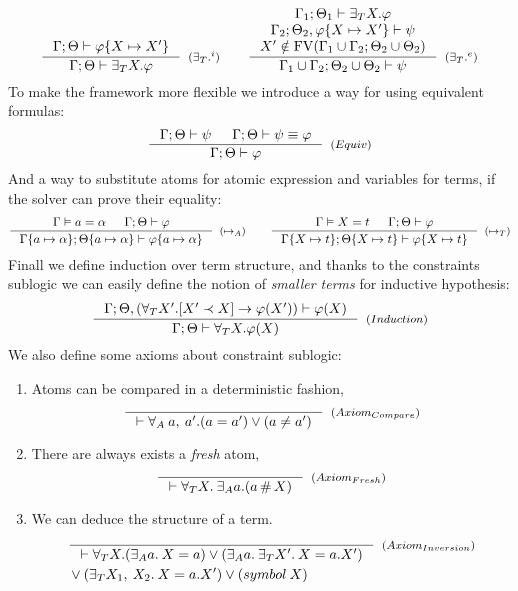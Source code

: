 \documentclass[english, mgr]{iithesis}
\begin{document}
$$
  \inference{
    \jgmnt[\cEnv;\Theta]{\formphi \{\termv \mapsto \termv'\}}
    }{
    \jgmnt[\cEnv;\Theta]{\fExistsTerm{\termv}\formphi}
  }[(\ensuremath{{\fExistsTerm{}}^i})]
  \qquad
  \inference{
    \jgmnt[\cEnv_1;\Theta_1]{\fExistsTerm{\termv}\formphi} \\
    \jgmnt[\cEnv_2;\Theta_2,\formphi \{\termv \mapsto \termv'\}]{\psi} \\
    \termv' \notin \fv[\cEnv_1 \cup \cEnv_2;\Theta_2 \cup \Theta_2]
    }{
    \jgmnt[\cEnv_1 \cup \cEnv_2;\Theta_2 \cup \Theta_2]{\psi}
  }[(\ensuremath{{\fExistsTerm{}}^e})]
$$
To make the framework more flexible we introduce a way for using equivalent formulas:
$$
  \inference{
    \jgmnt[\cEnv;\Theta]{\psi} &
    \jgmnt[\cEnv;\Theta]{\psi \equiv \formphi}
    }{
    \jgmnt[\cEnv;\Theta]{\formphi}
  }[(\ensuremath{Equiv})]
$$
And a way to substitute atoms for atomic expression and variables for terms, if the solver can prove their equality:
$$
  \inference{
    \cjgmnt[\cEnv]{\atomv \ceq \atomexp} &
    \jgmnt[\cEnv;\Theta]{\formphi}
    }{
    \jgmnt[\cEnv\{\atomv \mapsto \atomexp\};\Theta\{\atomv \mapsto \atomexp\}]{\formphi\{\atomv \mapsto \atomexp\}}
  }[(\ensuremath{\mapsto_A})]
\qquad
  \inference{
    \cjgmnt[\cEnv]{\termv \ceq \term} &
    \jgmnt[\cEnv;\Theta]{\formphi}
    }{
    \jgmnt[\cEnv\{\termv \mapsto \term\};\Theta\{\termv \mapsto \term\}]{\formphi\{\termv \mapsto \term\}}
  }[(\ensuremath{\mapsto_T})]
$$
Finall we define induction over term structure,
and thanks to the constraints sublogic we can easily define the notion of
\textit{smaller terms} for inductive hypothesis:
$$
  \inference{
    \jgmnt[\cEnv;\Theta, (\fForallTerm{\termv'} \fCImp{\termv' \cshlt \termv} \formphi(\termv'))]{\formphi(\termv)}
    }{
    \jgmnt[\cEnv;\Theta]{\fForallTerm{\termv} \formphi(\termv)}
  }[(\ensuremath{Induction})]
$$
We also define some axioms about constraint sublogic:
\begin{enumerate}
\item Atoms can be compared in a deterministic fashion,
$$
  \inference{
    }{
    \jgmnt[]{\fForallAtom{\:\atomv,\:\atomv'} (\atomv \ceq \atomv') \vee (\atomv \cneq \atomv')}
  }[(\ensuremath{Axiom_{Compare}})]
$$
\item There are always exists a \textit{fresh} atom,
$$
  \inference{
    }{
    \jgmnt[]{\fForallTerm{\termv} \:\fExistsAtom{\atomv} (\atomv \cfresh \termv)}
  }[(\ensuremath{Axiom_{Fresh}})]
$$
\item We can deduce the structure of a term.
\begin{eqnarray*}
  & \inference{
    }{
    \jgmnt[]{\fForallTerm{\termv} (\fExistsAtom{\atomv}\: \termv = \atomv) \vee (\fExistsAtom{\atomv}\:\fExistsTerm{\termv'}\: \termv = \tbind{\atomv}{\termv'}) }
  }[(\ensuremath{Axiom_{Inversion}})] \\
  & \ensuremath{\vee (\fExistsTerm{\termv_1,\:\termv_2}\: \termv = \tbind{\atomv}{\termv'}) \vee ({symbol}\: \termv) } \\
\end{eqnarray*}
\end{enumerate}
\end{document}
